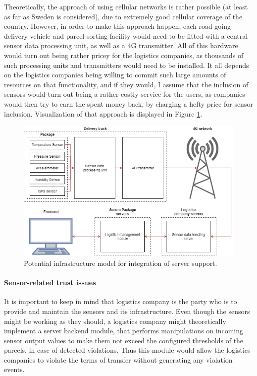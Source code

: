 Theoretically, the approach of using cellular networks is rather possible (at least as far as Sweden is considered), due to extremely good cellular coverage of the country. However, in order to make this approach happen, each  road-going delivery vehicle and parcel sorting facility would need to be fitted with a central sensor data processing unit, as well as a 4G transmitter. All of this hardware would turn out being rather pricey for the logistics companies, as thousands of such processing units and transmitters would need to be installed. It all depends on the logistics companies being willing to commit such large amounts of resources on that functionality, and if they would, I assume that the inclusion of sensors would turn out being a rather costly service for the users, as companies would then try to earn the spent money back, by charging a hefty price for sensor inclusion. Visualization of that approach is displayed in Figure \ref{fig:sensorinfrastructure}.

\begin{figure}[H]
\centering
\includegraphics[scale=0.5]{images/infrastructuresensor.png}
\caption{Potential infrastructure model for integration of server support.}
\label{fig:sensorinfrastructure}
\end{figure}

\paragraph{Sensor-related trust issues}
It is important to keep in mind that logistics company is the party who is to provide and maintain the sensors and its infrastructure. Even though the sensors might be working as they should, a logistics company might theoretically implement a server backend module, that performs manipulations on incoming sensor output values to make them not exceed the configured thresholds of the parcels, in case of detected violations. Thus this module would allow the logistics companies to violate the terms of transfer without generating any violation events. 


